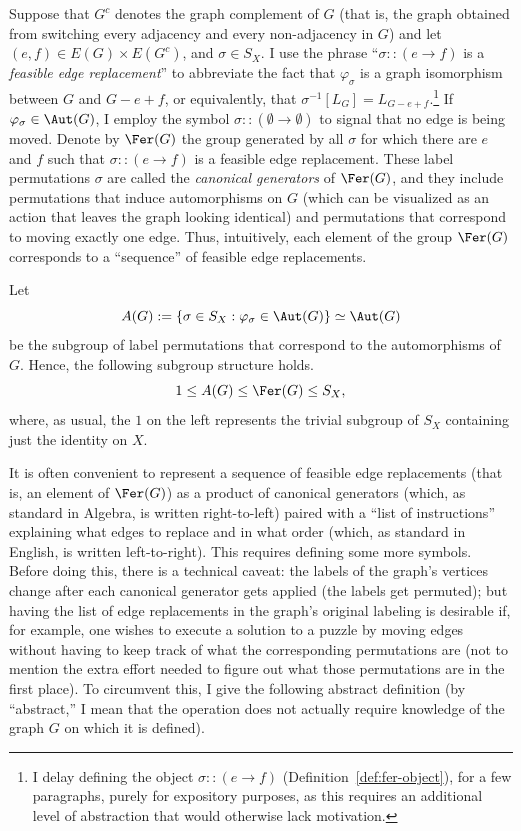 Suppose that $G^c$ denotes the graph complement of $G$ (that is, the graph obtained from switching every adjacency and every non-adjacency in $G$) and let $(e,f)\in E(G)\times E(G^c)$, and $\sigma\in S_X$.
I use the phrase ``$\sigma::(e\to f)$ is a \emph{feasible edge replacement}'' to abbreviate the fact that $\varphi_\sigma$ is a graph isomorphism between $G$ and $G-e+f$, or equivalently, that $\sigma^{-1}[L_G]=L_{G-e+f}$.\footnote{I delay defining the object $\sigma::(e\to f)$ (Definition~\ref{def:fer-object}), for a few paragraphs, purely for expository purposes, as this requires an additional level of abstraction that would otherwise lack motivation.}
If $\varphi_\sigma\in\Aut(G)$, I employ the symbol $\sigma::(\emptyset\to\emptyset)$ to signal that no edge is being moved.
Denote by $\Fer(G)$ the group generated by all $\sigma$ for which there are $e$ and $f$ such that $\sigma::(e\to f)$ is a feasible edge replacement.
These label permutations $\sigma$ are called the \emph{canonical generators} of $\Fer(G)$, and they include permutations that induce automorphisms on $G$ (which can be visualized as an action that leaves the graph looking identical) and permutations that correspond to moving exactly one edge.
Thus, intuitively, each element of the group $\Fer(G)$ corresponds to a ``sequence'' of feasible edge replacements.

Let $$A(G):=\{\sigma\in S_X:\varphi_\sigma\in\Aut(G)\}\simeq\Aut(G)$$ be the subgroup of label permutations that correspond to the automorphisms of $G$.
Hence, the following subgroup structure holds.
$$1\leq A(G)\leq\Fer(G)\leq S_X,$$ where, as usual, the $1$ on the left represents the trivial subgroup of $S_X$ containing just the identity on $X$.

It is often convenient to represent a sequence of feasible edge replacements (that is, an element of $\Fer(G)$) as a product of canonical generators (which, as standard in Algebra, is written right-to-left) paired with a ``list of instructions'' explaining what edges to replace and in what order (which, as standard in English, is written left-to-right).
This requires defining some more symbols.
Before doing this, there is a technical caveat: the labels of the graph's vertices change after each canonical generator gets applied (the labels get permuted); but having the list of edge replacements in the graph's original labeling is desirable if, for example, one wishes to execute a solution to a puzzle by moving edges without having to keep track of what the corresponding permutations are (not to mention the extra effort needed to figure out what those permutations are in the first place).
To circumvent this, I give the following abstract definition (by ``abstract,'' I mean that the operation does not actually require knowledge of the graph $G$ on which it is defined).

